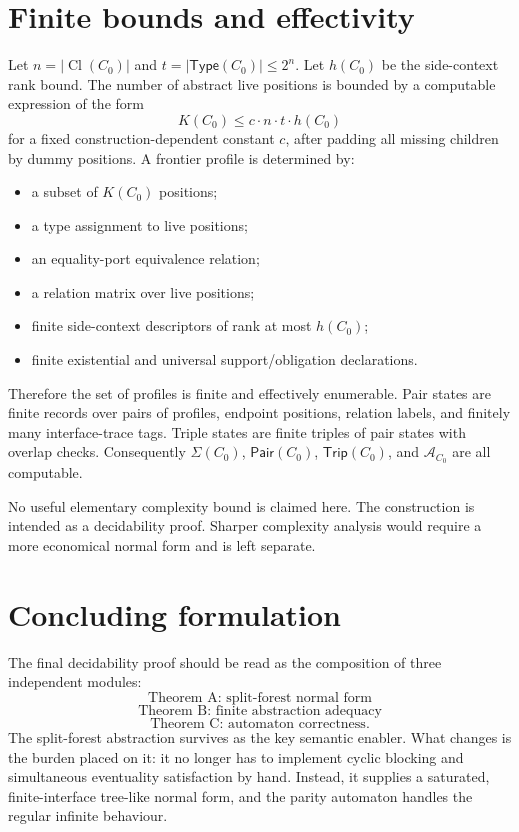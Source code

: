 \documentclass[11pt]{article}
\newcommand{\Cl}{\operatorname{Cl}}
\newcommand{\Typ}{\mathsf{Type}}
\newcommand{\Aut}{\mathcal A}
\newcommand{\Pair}{\mathsf{Pair}}
\newcommand{\Trip}{\mathsf{Trip}}
\begin{document}
\section{Finite bounds and effectivity}

Let $n=|\Cl(C_0)|$ and $t=|\Typ(C_0)|\le 2^n$.  Let $h(C_0)$ be the side-context rank bound.  The number of abstract live positions is bounded by a computable expression of the form
\[
  K(C_0)\le c\cdot n\cdot t\cdot h(C_0)
\]
for a fixed construction-dependent constant $c$, after padding all missing children by dummy positions.  A frontier profile is determined by:
\begin{itemize}
\item a subset of $K(C_0)$ positions;
\item a type assignment to live positions;
\item an equality-port equivalence relation;
\item a relation matrix over live positions;
\item finite side-context descriptors of rank at most $h(C_0)$;
\item finite existential and universal support/obligation declarations.
\end{itemize}
Therefore the set of profiles is finite and effectively enumerable.  Pair states are finite records over pairs of profiles, endpoint positions, relation labels, and finitely many interface-trace tags.  Triple states are finite triples of pair states with overlap checks.  Consequently $\Sigma(C_0)$, $\Pair(C_0)$, $\Trip(C_0)$, and $\Aut_{C_0}$ are all computable.

No useful elementary complexity bound is claimed here.  The construction is intended as a decidability proof.  Sharper complexity analysis would require a more economical normal form and is left separate.

\section{Concluding formulation}

The final decidability proof should be read as the composition of three independent modules:
\[
\boxed{\text{Theorem A: split-forest normal form}}
\]
\[
\boxed{\text{Theorem B: finite abstraction adequacy}}
\]
\[
\boxed{\text{Theorem C: automaton correctness}.}
\]
The split-forest abstraction survives as the key semantic enabler.  What changes is the burden placed on it: it no longer has to implement cyclic blocking and simultaneous eventuality satisfaction by hand.  Instead, it supplies a saturated, finite-interface tree-like normal form, and the parity automaton handles the regular infinite behaviour.
\end{document}
